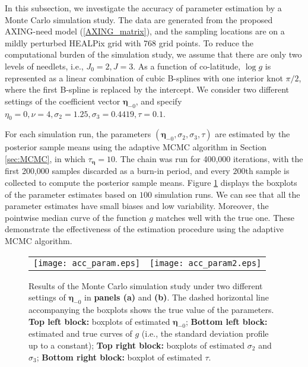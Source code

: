 \documentclass[aoas,preprint]{imsart}
\numberwithin{equation}{section}
\theoremstyle{plain}
\begin{document}
In this subsection, we investigate the accuracy of parameter estimation by a Monte Carlo simulation study. The data are generated from the proposed AXING-need model  (\ref{AXING_matrix}), and the sampling locations are on a mildly perturbed HEALPix grid \citep{Gorski-05} with 768 grid points. To reduce the computational burden of the simulation study, we assume that there are only two levels of needlets, i.e., $J_0=2, J=3$. As a function of co-latitude, $\log{g}$ is represented as a linear combination of cubic B-splines with one interior knot $\pi/2$, where the first B-spline is replaced by the intercept. We consider two different settings of the coefficient vector $\bm{\eta}_{-0}$, and specify $\eta_0=0, \nu=4, \sigma_2=1.25, \sigma_3=0.4419, \tau=0.1$.

For each simulation run, the parameters $(\bm{\eta}_{-0}, \sigma_2, \sigma_3, \tau)$ are estimated by the posterior sample means using the adaptive MCMC algorithm in Section \ref{sec:MCMC}, in which 
$\tau_{\bm{\eta}}=10$. The chain was run for 400,000 iterations, with the first 200,000 samples discarded as a burn-in period, and every $200$th sample is collected to compute the posterior sample means.
Figure \ref{fig:sim_para_acc_1} displays the boxplots of the parameter estimates based on $100$ simulation runs. We can see that all the parameter estimates have small biases and low variability. Moreover, the pointwise median curve of the function $g$ matches well with  the true one. These demonstrate the effectiveness of the estimation procedure using the adaptive MCMC algorithm.

\begin{figure}[htbp] %
   \centering
   \begin{tabular}{cc}
		\hspace{-0.1in} \texttt{[image: acc\_param.eps]} \hspace{-0.2in} & \texttt{[image: acc\_param2.eps]}\\
   \end{tabular}
   \caption{Results of the Monte Carlo simulation study under two different settings of $\bm{\eta}_{-0}$ in \textbf{panels (a)} and \textbf{(b)}. The dashed horizontal line accompanying the boxplots shows the true value of the parameters. \textbf{Top left block:} boxplots of estimated $\bm{\eta}_{-0}$; \textbf{Bottom left block:} estimated and true curves of $g$ (i.e., the standard deviation profile up to a constant); \textbf{Top right block:} boxplots of estimated $\sigma_2$ and $\sigma_3$; \textbf{Bottom right block:} boxplot of estimated $\tau$.}
   \label{fig:sim_para_acc_1}
\end{figure}
\end{document}
